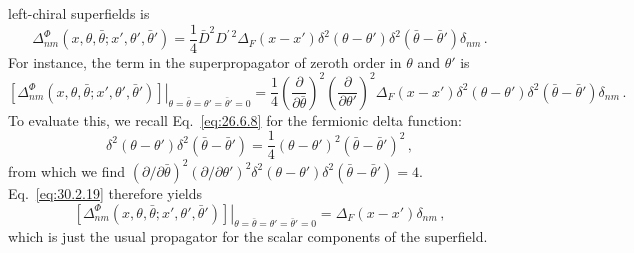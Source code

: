 left-chiral superfields is
\begin{equation}
  \Delta^\Phi_{nm}(x,\theta,\bar\theta;x',\theta',\bar\theta')
  =\frac14\bar D^2D^{\prime\,2}
    \Delta_F(x-x')\delta^2(\theta-\theta')
    \delta^2(\bar\theta-\bar\theta')\delta_{nm}\,.
  \tag{30.2.18}\label{eq:30.2.18}
\end{equation}
For instance, the term in the superpropagator of zeroth order in \(\theta\)
and \(\theta'\) is
\begin{equation}
  \left.
  \left[\Delta^\Phi_{nm}
    (x,\theta,\bar\theta;x',\theta',\bar\theta')\right]
  \right|_{\theta=\bar\theta=\theta'=\bar\theta'=0}
  =\frac14
    \left(\frac{\partial}{\partial\bar\theta}\right)^2
    \left(\frac{\partial}{\partial\theta'}\right)^2
    \Delta_F(x-x')\delta^2(\theta-\theta')
    \delta^2(\bar\theta-\bar\theta')\delta_{nm}\,.
  \tag{30.2.19}\label{eq:30.2.19}
\end{equation}
To evaluate this, we recall Eq.~\eqref{eq:26.6.8} for the fermionic delta
function:
\[
  \delta^2(\theta-\theta')\delta^2(\bar\theta-\bar\theta')
  =\frac14
    (\theta-\theta')^2(\bar\theta-\bar\theta')^2\,,
\]
from which we find
\((\partial/\partial\bar\theta)^2
(\partial/\partial\theta')^2
\delta^2(\theta-\theta')\delta^2(\bar\theta-\bar\theta')=4\).
Eq.~\eqref{eq:30.2.19} therefore yields
\begin{equation}
  \left.
  \left[\Delta^\Phi_{nm}
    (x,\theta,\bar\theta;x',\theta',\bar\theta')\right]
  \right|_{\theta=\bar\theta=\theta'=\bar\theta'=0}
  =\Delta_F(x-x')\delta_{nm}\,,
  \tag{30.2.20}\label{eq:30.2.20}
\end{equation}
which is just the usual propagator for the scalar components of the
superfield.
